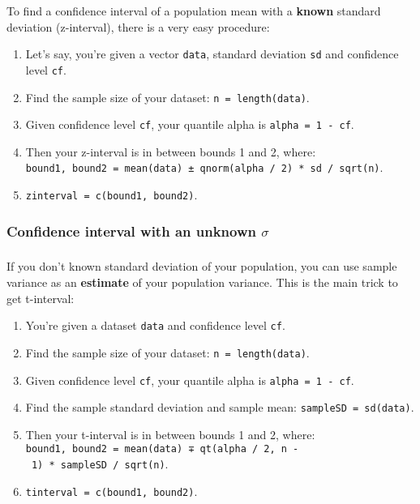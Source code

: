 To find a confidence interval of a population mean with a \textbf{known}
standard deviation (z-interval), there is a very easy procedure:

\begin{enumerate}
\def\labelenumi{\arabic{enumi}.}
\tightlist
\item
  Let's say, you're given a vector \texttt{data}, standard deviation
  \texttt{sd} and confidence level \texttt{cf}.
\item
  Find the sample size of your dataset: \texttt{n\ =\ length(data)}.
\item
  Given confidence level \texttt{cf}, your quantile alpha is
  \texttt{alpha\ =\ 1\ -\ cf}.
\item
  Then your z-interval is in between bounds 1 and 2, where:
  \texttt{bound1,\ bound2\ =\ mean(data)\ ±\ qnorm(alpha\ /\ 2)\ *\ sd\ /\ sqrt(n)}.
\item
  \texttt{zinterval\ =\ c(bound1,\ bound2)}.
\end{enumerate}

\hypertarget{confidence-interval-with-an-unknown-sigma}{%
\subsubsection{\texorpdfstring{Confidence interval with an unknown
\(\sigma\)}{Confidence interval with an unknown \textbackslash sigma}}\label{confidence-interval-with-an-unknown-sigma}}

\hypertarget{section-1}{%
\subsubsection{}\label{section-1}}

If you don't known standard deviation of your population, you can use
sample variance as an \textbf{estimate} of your population variance.
This is the main trick to get t-interval:

\begin{enumerate}
\def\labelenumi{\arabic{enumi}.}
\tightlist
\item
  You're given a dataset \texttt{data} and confidence level \texttt{cf}.
\item
  Find the sample size of your dataset: \texttt{n\ =\ length(data)}.
\item
  Given confidence level \texttt{cf}, your quantile alpha is
  \texttt{alpha\ =\ 1\ -\ cf}.
\item
  Find the sample standard deviation and sample mean:
  \texttt{sampleSD\ =\ sd(data)}.
\item
  Then your t-interval is in between bounds 1 and 2, where:
  \texttt{bound1,\ bound2\ =\ mean(data)\ ∓\ qt(alpha\ /\ 2,\ n\ -\ 1)\ *\ sampleSD\ /\ sqrt(n)}.
\item
  \texttt{tinterval\ =\ c(bound1,\ bound2)}.
\end{enumerate}

